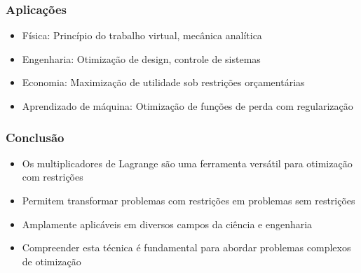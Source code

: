 \documentclass{beamer}
\begin{document}
\begin{frame}
\frametitle{Aplicações}
\begin{itemize}
    \item Física: Princípio do trabalho virtual, mecânica analítica
    \item Engenharia: Otimização de design, controle de sistemas
    \item Economia: Maximização de utilidade sob restrições orçamentárias
    \item Aprendizado de máquina: Otimização de funções de perda com regularização
\end{itemize}
\end{frame}

\begin{frame}
\frametitle{Conclusão}
\begin{itemize}
    \item Os multiplicadores de Lagrange são uma ferramenta versátil para otimização com restrições
    \item Permitem transformar problemas com restrições em problemas sem restrições
    \item Amplamente aplicáveis em diversos campos da ciência e engenharia
    \item Compreender esta técnica é fundamental para abordar problemas complexos de otimização
\end{itemize}
\end{frame}
\end{document}
